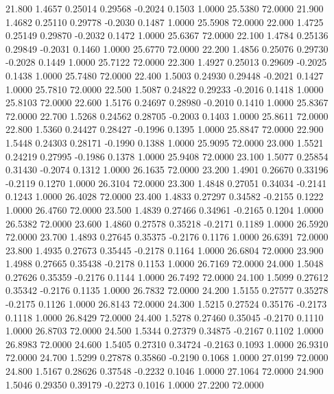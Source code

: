   21.800   1.4657   0.25014   0.29568  -0.2024   0.1503   1.0000  25.5380  72.0000
  21.900   1.4682   0.25110   0.29778  -0.2030   0.1487   1.0000  25.5908  72.0000
  22.000   1.4725   0.25149   0.29870  -0.2032   0.1472   1.0000  25.6367  72.0000
  22.100   1.4784   0.25136   0.29849  -0.2031   0.1460   1.0000  25.6770  72.0000
  22.200   1.4856   0.25076   0.29730  -0.2028   0.1449   1.0000  25.7122  72.0000
  22.300   1.4927   0.25013   0.29609  -0.2025   0.1438   1.0000  25.7480  72.0000
  22.400   1.5003   0.24930   0.29448  -0.2021   0.1427   1.0000  25.7810  72.0000
  22.500   1.5087   0.24822   0.29233  -0.2016   0.1418   1.0000  25.8103  72.0000
  22.600   1.5176   0.24697   0.28980  -0.2010   0.1410   1.0000  25.8367  72.0000
  22.700   1.5268   0.24562   0.28705  -0.2003   0.1403   1.0000  25.8611  72.0000
  22.800   1.5360   0.24427   0.28427  -0.1996   0.1395   1.0000  25.8847  72.0000
  22.900   1.5448   0.24303   0.28171  -0.1990   0.1388   1.0000  25.9095  72.0000
  23.000   1.5521   0.24219   0.27995  -0.1986   0.1378   1.0000  25.9408  72.0000
  23.100   1.5077   0.25854   0.31430  -0.2074   0.1312   1.0000  26.1635  72.0000
  23.200   1.4901   0.26670   0.33196  -0.2119   0.1270   1.0000  26.3104  72.0000
  23.300   1.4848   0.27051   0.34034  -0.2141   0.1243   1.0000  26.4028  72.0000
  23.400   1.4833   0.27297   0.34582  -0.2155   0.1222   1.0000  26.4760  72.0000
  23.500   1.4839   0.27466   0.34961  -0.2165   0.1204   1.0000  26.5382  72.0000
  23.600   1.4860   0.27578   0.35218  -0.2171   0.1189   1.0000  26.5920  72.0000
  23.700   1.4893   0.27645   0.35375  -0.2176   0.1176   1.0000  26.6391  72.0000
  23.800   1.4935   0.27673   0.35445  -0.2178   0.1164   1.0000  26.6804  72.0000
  23.900   1.4988   0.27665   0.35438  -0.2178   0.1153   1.0000  26.7169  72.0000
  24.000   1.5048   0.27626   0.35359  -0.2176   0.1144   1.0000  26.7492  72.0000
  24.100   1.5099   0.27612   0.35342  -0.2176   0.1135   1.0000  26.7832  72.0000
  24.200   1.5155   0.27577   0.35278  -0.2175   0.1126   1.0000  26.8143  72.0000
  24.300   1.5215   0.27524   0.35176  -0.2173   0.1118   1.0000  26.8429  72.0000
  24.400   1.5278   0.27460   0.35045  -0.2170   0.1110   1.0000  26.8703  72.0000
  24.500   1.5344   0.27379   0.34875  -0.2167   0.1102   1.0000  26.8983  72.0000
  24.600   1.5405   0.27310   0.34724  -0.2163   0.1093   1.0000  26.9310  72.0000
  24.700   1.5299   0.27878   0.35860  -0.2190   0.1068   1.0000  27.0199  72.0000
  24.800   1.5167   0.28626   0.37548  -0.2232   0.1046   1.0000  27.1064  72.0000
  24.900   1.5046   0.29350   0.39179  -0.2273   0.1016   1.0000  27.2200  72.0000
